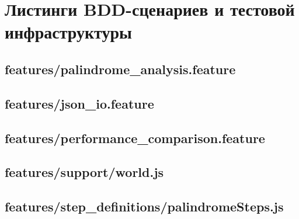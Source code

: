 \chapter{Листинги BDD-сценариев и тестовой инфраструктуры}\label{appendix-tests-code}

\section*{features/palindrome\_analysis.feature}


\section*{features/json\_io.feature}


\section*{features/performance\_comparison.feature}


\section*{features/support/world.js}


\section*{features/step\_definitions/palindromeSteps.js}


